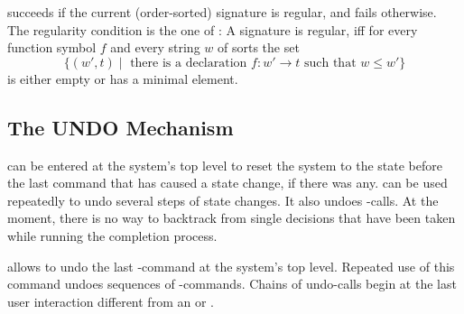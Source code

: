 \begin{command}
succeeds if the current (order-sorted) signature is regular,
and fails otherwise.
The regularity condition is the one of \cite{GM87}:
A signature is regular, iff for every function symbol
$f$ and every string $w$ of sorts the set
$$
   \{ (w',t) \mid \mbox{\ there is a declaration\ } f : w' \rightarrow t 
      \mbox{\ such that\ } w \leq w' \}
$$
is either empty or has a minimal element.
\end{command}

\subsection{The UNDO Mechanism}

\begin{command}
can be entered at the system's top level to reset the system to the state
before the last command that has caused a state change, if there was
any.  can be used repeatedly to undo several steps of state changes.
It also undoes -calls. At the moment, there is no way to backtrack
from single decisions that have been taken while running the completion
process.
\end{command}

\begin{command}
allows to undo the last -command at the system's top level. Repeated use of
this command undoes sequences of -commands. Chains of undo-calls begin at 
the last user interaction different from an  or .
\end{command}


